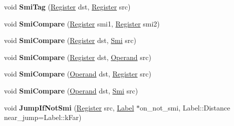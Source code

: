 \begin{DoxyCompactItemize}
\mbox{\label{classv8_1_1internal_1_1MacroAssembler_a74b4779456ca00de03d435930010cc7d}} 
void {\bfseries Smi\+Tag} (\mbox{\hyperlink{classv8_1_1internal_1_1Register}{Register}} dst, \mbox{\hyperlink{classv8_1_1internal_1_1Register}{Register}} src)
\item 
\mbox{\label{classv8_1_1internal_1_1MacroAssembler_ae3e151a58fd54b91e16220041744a954}} 
void {\bfseries Smi\+Compare} (\mbox{\hyperlink{classv8_1_1internal_1_1Register}{Register}} smi1, \mbox{\hyperlink{classv8_1_1internal_1_1Register}{Register}} smi2)
\item 
\mbox{\label{classv8_1_1internal_1_1MacroAssembler_a6a5b1ca43036484966e964f514b20e31}} 
void {\bfseries Smi\+Compare} (\mbox{\hyperlink{classv8_1_1internal_1_1Register}{Register}} dst, \mbox{\hyperlink{classv8_1_1internal_1_1Smi}{Smi}} src)
\item 
\mbox{\label{classv8_1_1internal_1_1MacroAssembler_abd7e1e034a1e9f9c448f0bf159cb39f5}} 
void {\bfseries Smi\+Compare} (\mbox{\hyperlink{classv8_1_1internal_1_1Register}{Register}} dst, \mbox{\hyperlink{classv8_1_1internal_1_1Operand}{Operand}} src)
\item 
\mbox{\label{classv8_1_1internal_1_1MacroAssembler_a5832e75566771a1b841ea0d9e11acd74}} 
void {\bfseries Smi\+Compare} (\mbox{\hyperlink{classv8_1_1internal_1_1Operand}{Operand}} dst, \mbox{\hyperlink{classv8_1_1internal_1_1Register}{Register}} src)
\item 
\mbox{\label{classv8_1_1internal_1_1MacroAssembler_a1dc9db3030f9d1c34d5b04b8309ca31e}} 
void {\bfseries Smi\+Compare} (\mbox{\hyperlink{classv8_1_1internal_1_1Operand}{Operand}} dst, \mbox{\hyperlink{classv8_1_1internal_1_1Smi}{Smi}} src)
\item 
\mbox{\label{classv8_1_1internal_1_1MacroAssembler_a424896238cb8817cfecb78c5bec11d71}} 
void {\bfseries Jump\+If\+Not\+Smi} (\mbox{\hyperlink{classv8_1_1internal_1_1Register}{Register}} src, \mbox{\hyperlink{classv8_1_1internal_1_1Label}{Label}} $\ast$on\+\_\+not\+\_\+smi, Label\+::\+Distance near\+\_\+jump=Label\+::k\+Far)

\end{DoxyCompactItemize}
